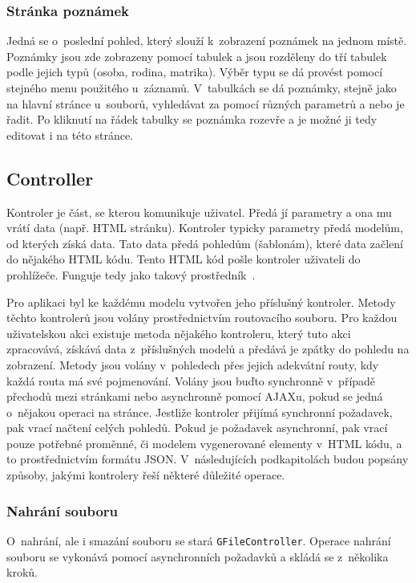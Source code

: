 \subsubsection{Stránka poznámek}
Jedná se o~poslední pohled, který slouží k~zobrazení poznámek na jednom místě. Poznámky jsou zde zobrazeny pomocí tabulek a jsou rozděleny do tří tabulek podle jejich typů (osoba, rodina, matrika). Výběr typu se dá provést pomocí stejného menu použitého u~záznamů. V~tabulkách se dá poznámky, stejně jako na hlavní stránce u~souborů, vyhledávat za pomocí různých parametrů a nebo je řadit. Po kliknutí na řádek tabulky se poznámka rozevře a je možné ji tedy editovat i na této stránce.

\subsection{Controller}
\label{controller}
Kontroler je část, se kterou komunikuje uživatel. Předá jí parametry a ona mu vrátí data (např. HTML stránku). Kontroler typicky parametry předá modelům, od kterých získá data. Tato data předá pohledům (šablonám), které data začlení do nějakého HTML kódu. Tento HTML kód pošle kontroler uživateli do prohlížeče. Funguje tedy jako takový prostředník~\cite{Laravel2}.

Pro aplikaci byl ke každému modelu vytvořen jeho příslušný kontroler. Metody těchto kontrolerů jsou volány prostřednictvím routovacího souboru. Pro každou uživatelskou akci existuje metoda nějakého kontroleru, který tuto akci zpracovává, získává data z~příslušných modelů a předává je zpátky do pohledu na zobrazení. Metody jsou volány v~pohledech přes jejich adekvátní routy, kdy každá routa má své pojmenování. Volány jsou buďto synchronně v~případě přechodů mezi stránkami nebo asynchronně pomocí AJAXu, pokud se jedná o~nějakou operaci na stránce. Jestliže kontroler přijímá synchronní požadavek, pak vrací načtení celých pohledů. Pokud je požadavek asynchronní, pak vrací pouze potřebné proměnné, či modelem vygenerované elementy v~HTML kódu, a to prostřednictvím formátu JSON. V~následujících podkapitolách budou popsány způsoby, jakými kontrolery řeší některé důležité operace.

\subsubsection{Nahrání souboru}
O~nahrání, ale i smazání souboru se stará \verb|GFileController|. Operace nahrání souboru se vykonává pomocí asynchronních požadavků a skládá se z~několika kroků.

